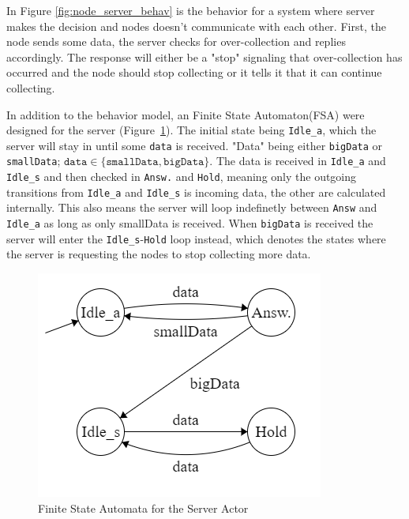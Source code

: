 In Figure \ref{fig:node_server_behav} is the behavior for a system where server makes the decision and nodes doesn't communicate with each other. First, the node sends some data, the server checks for over-collection and replies accordingly. The response will either be a "stop" signaling that over-collection has occurred and the node should stop collecting or it tells it that it can continue collecting. 

In addition to the behavior model, an Finite State Automaton(FSA) were designed for the server (Figure~\ref{fig:server_states}). The initial state being \texttt{Idle\_a}, which the server will stay in until some \texttt{data} is received. "Data" being either \texttt{bigData} or \texttt{smallData}; $ \texttt{data} \in \{ \texttt{smallData}, \texttt{bigData} \} $. The data is received in \texttt{Idle\_a} and \texttt{Idle\_s} and then checked in \texttt{Answ.} and \texttt{Hold}, meaning only the outgoing transitions from \texttt{Idle\_a} and \texttt{Idle\_s} is incoming data, the other are calculated internally. This also means the server will loop indefinetly between \texttt{Answ} and \texttt{Idle\_a} as long as only smallData is received. When \texttt{bigData} is received the server will enter the \texttt{Idle\_s}-\texttt{Hold} loop instead, which denotes the states where the server is requesting the nodes to stop collecting more data. 


\begin{figure}[ht]
    \includegraphics{include/figures/server_actor_fsm}
    \caption{Finite State Automata for the Server Actor}
    \label{fig:server_states}
\end{figure}

